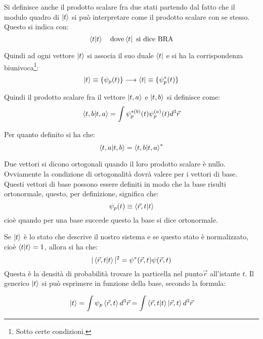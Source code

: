 Si definisce anche il prodotto scalare fra due stati partendo dal fatto che il
modulo quadro di $\ket{t}$ si può interpretare come il prodotto scalare con se
stesso. Questo si indica con:
\begin{equation}
\braket{t|t} \quad \text{dove} \bra{t} \text{  si dice BRA}
\end{equation}

Quindi ad ogni vettore $\ket{t}$ si associa il suo duale $\bra{t}$ e si ha la
corrispondenza biunivoca\footnote{Sotto certe condizioni. }:
\begin{equation}
\ket{t}\equiv \{\psi_{p}(t)\}\longrightarrow \bra{t} \equiv\{\psi^*_{p}(t)\}
\end{equation}

Quindi il prodotto scalare fra il vettore $\ket{t,a}$ e $\ket{t,b}$ si definisce
come:
\begin{equation}
\braket{t,b|t,a}=\int\psi^{*(b)}_p(t)\psi^{(a)}_p(t) d^3\vec{r}
\end{equation}

Per quanto definito si ha che:
\begin{equation}
\braket{t,a|t,b}=\braket{t,b|t,a}^*
\end{equation}

Due vettori si dicono ortogonali quando il loro prodotto scalare è nullo.
Ovviamente la condizione di ortogonalità dovrà valere per i vettori di base.
Questi vettori di base possono essere definiti in modo che la base risulti
ortonormale, questo, per definizione, significa che:
\begin{equation}
\psi_p(t)\equiv \braket{\vec{r},t|t}
\end{equation}
cioè quando per una base succede questo la base si dice ortonormale.

Se $\ket{t}$ è lo stato che descrive il nostro sistema e se questo stato è
normalizzato, cioè $\braket{t|t}=1$, allora si ha che:
\begin{equation}
|\braket{\vec{r},t|t}|^2=\psi^*(\vec{r},t)\psi(\vec{r},t)
\end{equation}
Questa è la densità di probabilità trovare la particella nel punto$\vec{r}$
all'istante $t$. Il generico $\ket{t}$
 si può esprimere in funzione della base, secondo la formula:
 
\begin{equation}
\ket{t}= \int{\psi_{p}\braket{\vec{r},t}d^3\vec{r}}=\int{\braket{\vec{r},t|t}}\ket{\vec{r},t}d^3\vec{r}
\end{equation}

